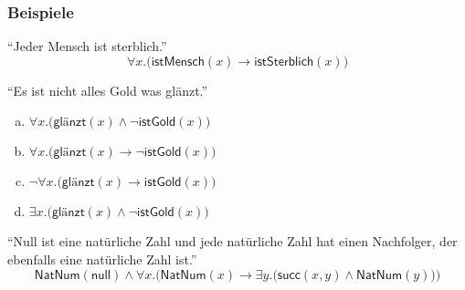 \documentclass[aspectratio=1610,onlymath]{beamer}
\begin{document}
\begin{frame}\frametitle{Beispiele}

\alert{"`Jeder Mensch ist sterblich."'}
\[ \forall x.\big(\textsf{istMensch}(x)\to\textsf{istSterblich}(x)\big)\]

\pause\alert{"`Es ist nicht alles Gold was glänzt."'}\pause
\begin{center}\begin{minipage}{6.5cm}
\begin{enumerate}[(a)]
\item $\forall x.\big(\textsf{glänzt}(x)\wedge\neg\textsf{istGold}(x)\big)$ 
\item $\forall x.\big(\textsf{glänzt}(x)\to\neg\textsf{istGold}(x)\big)$ 
\item $\neg\forall x.\big(\textsf{glänzt}(x)\to\textsf{istGold}(x)\big)$ 
\item $\exists x.\big(\textsf{glänzt}(x)\wedge\neg\textsf{istGold}(x)\big)$ 
\end{enumerate}\end{minipage}\end{center}

\pause\pause\bigskip
\alert{"`Null ist eine natürliche Zahl und jede natürliche Zahl hat einen Nachfolger, der
ebenfalls eine natürliche Zahl ist."'}
\[ \textsf{NatNum}(\textsf{null})\wedge \forall x.\Big(\textsf{NatNum}(x)\to\exists y.\big(\textsf{succ}(x,y)\wedge \textsf{NatNum}(y)\big)\Big)\]


\end{frame}
\end{document}
